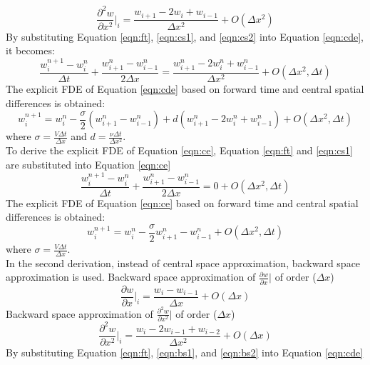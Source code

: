\documentclass[letterpaper,12pt]{article}
\begin{document}
\begin{equation}
	\frac{\partial^2 w}{\partial x^2}\vert_{i}=\frac{w_{i+1}-2w_i+w_{i-1}}{\Delta x^2}+O(\Delta x^2)
	\label{eqn:cs2}
\end{equation}
By substituting Equation \ref{eqn:ft}, \ref{eqn:cs1}, and \ref{eqn:cs2} into Equation \ref{eqn:cde}, it becomes:
\begin{equation}
	\frac{w_{i}^{n+1}-{w_{i}^{n}}}{\Delta t}+\frac{w_{i+1}^{n}-w_{i-1}^{n}}{2\Delta x}
	=\frac{w_{i+1}^{n}-2w_{i}^{n}+w_{i-1}^{n}}{\Delta x^2}+O(\Delta x^2, \Delta t)
\end{equation}
The explicit FDE of Equation \ref{eqn:cde} based on forward time and central spatial differences is obtained:
\begin{equation}
	w_{i}^{n+1}= w_{i}^{n}-\frac{\sigma}{2}(w_{i+1}^{n}-w_{i-1}^{n})+d(w_{i+1}^{n}-2w_{i}^{n}+w_{i-1}^{n})+O(\Delta x^2,\Delta t)
\end{equation}
where $\sigma = \frac{V\Delta t}{\Delta x }$ and $d = \frac{\nu\Delta t}{\Delta x^2 }$.
\\To derive the explicit FDE of Equation \ref{eqn:ce}, Equation \ref{eqn:ft} and \ref{eqn:cs1} are
substituted into Equation \ref{eqn:ce}
\begin{equation}
	\frac{w_{i}^{n+1}-{w_{i}^{n}}}{\Delta t}+\frac{w_{i+1}^{n}-w_{i-1}^{n}}{2\Delta x}
	=0+O(\Delta x^2, \Delta t)
\end{equation}
The explicit FDE of Equation \ref{eqn:ce} based on forward time and central spatial differences is obtained:
\begin{equation}
	w_{i}^{n+1}= w_{i}^{n}-\frac{\sigma}{2}w_{i+1}^{n}-w_{i-1}^{n}+O(\Delta x^2, \Delta t)
\end{equation}
where $\sigma = \frac{V\Delta t}{\Delta x }$.
\\In the second derivation, instead of central space approximation, backward space approximation is used.
Backward space approximation of $\frac{\partial w}{\partial x}\vert$ of order ($\Delta x$)
\begin{equation}
	\frac{\partial w}{\partial x}\vert_{i}=\frac{w_{i}-w_{i-1}}{\Delta x}+O(\Delta x)
	\label{eqn:bs1}
\end{equation}
Backward space approximation of $\frac{\partial^2 w}{\partial x^2}\vert$ of order ($\Delta x$)
\begin{equation}
	\frac{\partial^2 w}{\partial x^2}\vert_{i}=\frac{w_{i}-2w_{i-1}+w_{i-2}}{\Delta x^2}+O(\Delta x)
	\label{eqn:bs2}
\end{equation}
By substituting Equation \ref{eqn:ft}, \ref{eqn:bs1}, and \ref{eqn:bs2} into Equation \ref{eqn:cde}
\end{document}
